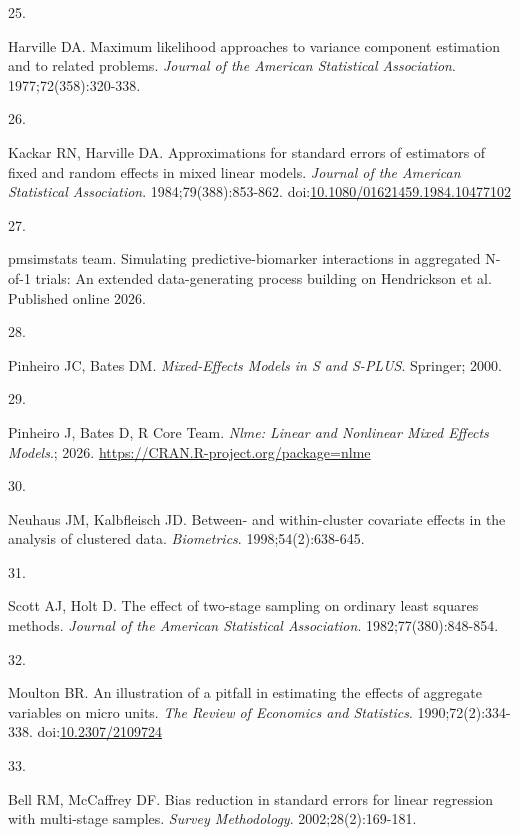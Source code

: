 \documentclass[
  11pt,
]{article}
\newlength{\cslhangindent}
\newlength{\csllabelwidth}
\newenvironment{CSLReferences}[2] %
 {\begin{list}{}{%
  \setlength{\itemindent}{0pt}
  \setlength{\leftmargin}{0pt}
  \setlength{\parsep}{0pt}
  \ifodd #1
   \setlength{\leftmargin}{\cslhangindent}
   \setlength{\itemindent}{-1\cslhangindent}
  \fi
  \setlength{\itemsep}{#2\baselineskip}}}
 {\end{list}}
\newcommand{\CSLLeftMargin}[1]{\parbox[t]{\csllabelwidth}{\strut#1\strut}}
\newcommand{\CSLRightInline}[1]{\parbox[t]{\linewidth - \csllabelwidth}{\strut#1\strut}}
\begin{document}
\begin{CSLReferences}{0}{1}
\CSLLeftMargin{25. }%
\CSLRightInline{Harville DA. Maximum likelihood approaches to variance component estimation and to related problems. \emph{Journal of the American Statistical Association}. 1977;72(358):320-338.}

\CSLLeftMargin{26. }%
\CSLRightInline{Kackar RN, Harville DA. Approximations for standard errors of estimators of fixed and random effects in mixed linear models. \emph{Journal of the American Statistical Association}. 1984;79(388):853-862. doi:\href{https://doi.org/10.1080/01621459.1984.10477102}{10.1080/01621459.1984.10477102}}

\CSLLeftMargin{27. }%
\CSLRightInline{{pmsimstats team}. Simulating predictive-biomarker interactions in aggregated {N}-of-1 trials: An extended data-generating process building on {Hendrickson} et al. Published online 2026.}

\CSLLeftMargin{28. }%
\CSLRightInline{Pinheiro JC, Bates DM. \emph{Mixed-Effects Models in {S} and {S-PLUS}}. Springer; 2000.}

\CSLLeftMargin{29. }%
\CSLRightInline{Pinheiro J, Bates D, R Core Team. \emph{Nlme: Linear and Nonlinear Mixed Effects Models}.; 2026. \url{https://CRAN.R-project.org/package=nlme}}

\CSLLeftMargin{30. }%
\CSLRightInline{Neuhaus JM, Kalbfleisch JD. Between- and within-cluster covariate effects in the analysis of clustered data. \emph{Biometrics}. 1998;54(2):638-645.}

\CSLLeftMargin{31. }%
\CSLRightInline{Scott AJ, Holt D. The effect of two-stage sampling on ordinary least squares methods. \emph{Journal of the American Statistical Association}. 1982;77(380):848-854.}

\CSLLeftMargin{32. }%
\CSLRightInline{Moulton BR. An illustration of a pitfall in estimating the effects of aggregate variables on micro units. \emph{The Review of Economics and Statistics}. 1990;72(2):334-338. doi:\href{https://doi.org/10.2307/2109724}{10.2307/2109724}}

\CSLLeftMargin{33. }%
\CSLRightInline{Bell RM, McCaffrey DF. Bias reduction in standard errors for linear regression with multi-stage samples. \emph{Survey Methodology}. 2002;28(2):169-181.}


\end{CSLReferences}
\end{document}
